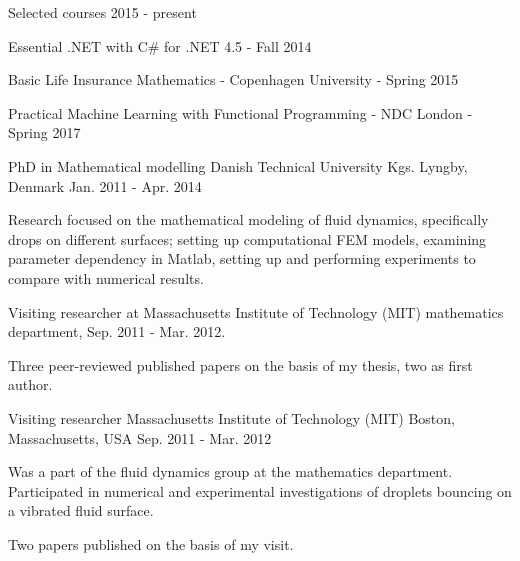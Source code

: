 


\begin{cventries}


\cventry
{} %
{Selected courses} %
{} %
{2015 - present} %
{ %
\begin{cvitems}
\item {Essential .NET with C\# for .NET 4.5 - Fall 2014}
\item {Basic Life Insurance Mathematics - Copenhagen University - Spring 2015}
\item {Practical Machine Learning with Functional Programming - NDC London - Spring 2017}
\end{cvitems}
}


\cventry
{PhD in Mathematical modelling} %
{Danish Technical University} %
{Kgs. Lyngby, Denmark} %
{Jan. 2011 - Apr. 2014} %
{ %
\begin{cvitems}
\item {Research focused on the mathematical modeling of fluid dynamics, specifically drops on different surfaces; setting up computational FEM models, examining parameter dependency in Matlab, setting up and performing experiments to compare with numerical results.}
\item Visiting researcher at Massachusetts Institute of Technology (MIT) mathematics department, Sep. 2011 - Mar. 2012.
\item Three peer-reviewed published papers on the basis of my thesis, two as first author.
\end{cvitems}
}

\cventry
{Visiting researcher} %
{Massachusetts Institute of Technology (MIT)} %
{Boston, Massachusetts, USA} %
{Sep. 2011 - Mar. 2012} %
{ %
\begin{cvitems}
\item {Was a part of the fluid dynamics group at the mathematics department. Participated in numerical and experimental investigations of droplets bouncing on a vibrated fluid surface.}
\item Two papers published on the basis of my visit.
\end{cvitems}
}


\end{cventries}
